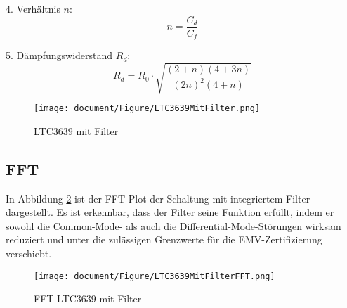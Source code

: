 4. Verhältnis \(n\):
\begin{equation}
    n = \frac{C_d}{C_f}
    \label{eqn:EffektiveKonvergenzordnung}
\end{equation} 

5. Dämpfungswiderstand \(R_d\):
\begin{equation}
    R_d = R_0 \cdot \sqrt{\frac{(2 + n)(4 + 3n)}{(2n)^2(4 + n)}}
    \label{eqn:EffektiveKonvergenzordnung}
\end{equation} 


\begin{figure}[H]
    \centering
    \texttt{[image: document/Figure/LTC3639MitFilter.png]}
    \caption{LTC3639 mit Filter}
    \label{fig:LTC3639MitFilter}
\end{figure}


\subsection{FFT}

In Abbildung \ref{fig:LTC3639MitFilterFFT} ist der FFT-Plot der Schaltung mit integriertem Filter dargestellt. Es ist erkennbar, dass der Filter seine Funktion erfüllt, indem er sowohl die Common-Mode- als auch die Differential-Mode-Störungen wirksam reduziert und unter die zulässigen Grenzwerte für die EMV-Zertifizierung verschiebt.


\begin{figure}[H]
    \centering
    \texttt{[image: document/Figure/LTC3639MitFilterFFT.png]}
    \caption{FFT LTC3639 mit Filter}
    \label{fig:LTC3639MitFilterFFT}
\end{figure}